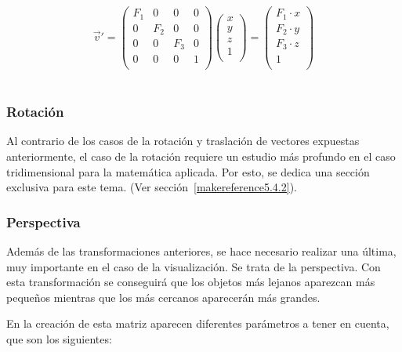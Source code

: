 \begin{equation}
	\label{eq:matrixscaling}
	\overrightarrow{v}' = 
	\left( \begin{array}{cccc}
			F_1 & 0   & 0   & 0	\\
			0   & F_2 & 0   & 0	\\
			0   & 0   & F_3 & 0	\\
			0   & 0   & 0   & 1	\\
	\end{array} \right)
	\left( \begin{array}{c}
			x \\
			y \\
			z \\
			1 \\
	\end{array} \right) =
	\left( \begin{array}{c}
			F_1\cdot x \\
			F_2\cdot y \\
			F_3\cdot z \\
			1 \\
	\end{array} \right)
\end{equation}\\

\subsubsection{Rotación}
\label{makereference5.4.1.3}

Al contrario de los casos de la rotación y traslación de vectores expuestas
anteriormente, el caso de la rotación requiere un estudio más profundo en el
caso tridimensional para la matemática aplicada. Por esto, se dedica una sección
exclusiva para este tema. (Ver sección~\ref{makereference5.4.2}).

\subsubsection{Perspectiva}
\label{ref:ProjectionMatrix}

Además de las transformaciones anteriores, se hace necesario realizar una
última, muy importante en el caso de la visualización. Se trata de la
perspectiva. Con esta transformación se conseguirá que los objetos más lejanos
aparezcan más pequeños mientras que los más cercanos aparecerán más grandes.

En la creación de esta matriz aparecen diferentes parámetros a tener en cuenta,
que son los siguientes:

